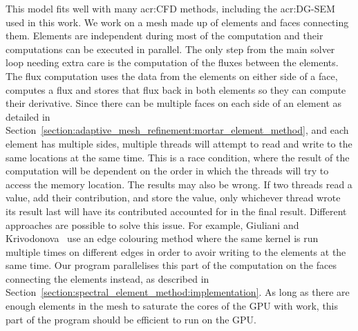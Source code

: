 This model fits well with many \acrshort{acr:CFD} methods, including the \acrshort{acr:DG-SEM} used
in this work. We work on a mesh made up of elements and faces connecting them. Elements are
independent during most of the computation and their computations can be executed in parallel. The
only step from the main solver loop needing extra care is the computation of the fluxes between the
elements. The flux computation uses the data from the elements on either side of a face, computes a
flux and stores that flux back in both elements so they can compute their derivative. Since there
can be multiple faces on each side of an element as detailed in
Section~\ref{section:adaptive_mesh_refinement:mortar_element_method}, and each element has multiple
sides, multiple threads will attempt to read and write to the same locations at the same time. This
is a race condition, where the result of the computation will be dependent on the order in which the
threads will try to access the memory location. The results may also be wrong. If two threads read a
value, add their contribution, and store the value, only whichever thread wrote its result last will
have its contributed accounted for in the final result. Different approaches are possible to solve
this issue. For example, Giuliani and Krivodonova~\cite{Giuliani2019} use an edge colouring method
where the same kernel is run multiple times on different edges in order to avoir writing to the
elements at the same time. Our program parallelises this part of the computation on the faces
connecting the elements instead, as described in
Section~\ref{section:spectral_element_method:implementation}. As long as there are enough elements
in the mesh to saturate the cores of the GPU with work, this part of the program should be efficient
to run on the GPU.

